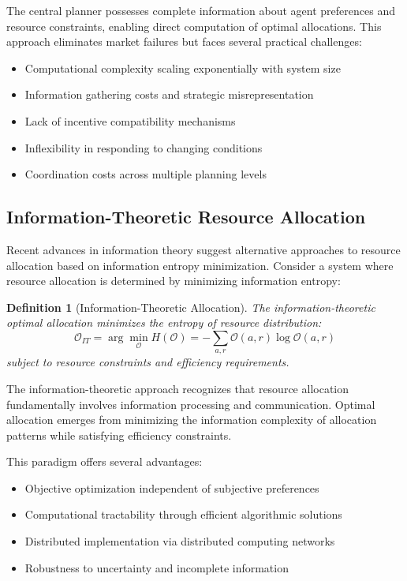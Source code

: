 \documentclass[12pt,a4paper]{article}
\newtheorem{definition}[theorem]{Definition}
\begin{document}
The central planner possesses complete information about agent preferences and resource constraints, enabling direct computation of optimal allocations. This approach eliminates market failures but faces several practical challenges:
\begin{itemize}
\item Computational complexity scaling exponentially with system size
\item Information gathering costs and strategic misrepresentation
\item Lack of incentive compatibility mechanisms
\item Inflexibility in responding to changing conditions
\item Coordination costs across multiple planning levels
\end{itemize}

\subsection{Information-Theoretic Resource Allocation}

Recent advances in information theory suggest alternative approaches to resource allocation based on information entropy minimization. Consider a system where resource allocation is determined by minimizing information entropy:

\begin{definition}[Information-Theoretic Allocation]
The information-theoretic optimal allocation minimizes the entropy of resource distribution:
\begin{equation}
\mathcal{O}_{IT} = \arg\min_{\mathcal{O}} H(\mathcal{O}) = -\sum_{a,r} \mathcal{O}(a,r) \log \mathcal{O}(a,r)
\end{equation}
subject to resource constraints and efficiency requirements.
\end{definition}

The information-theoretic approach recognizes that resource allocation fundamentally involves information processing and communication. Optimal allocation emerges from minimizing the information complexity of allocation patterns while satisfying efficiency constraints.

This paradigm offers several advantages:
\begin{itemize}
\item Objective optimization independent of subjective preferences
\item Computational tractability through efficient algorithmic solutions
\item Distributed implementation via distributed computing networks
\item Robustness to uncertainty and incomplete information
\end{itemize}
\end{document}
